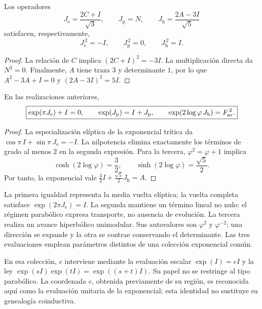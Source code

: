 \begin{proposition}
\label{euler-trit-generadores}
Los operadores
\[
 J_{\mathrm e}=\frac{2C+I}{\sqrt3},\qquad
 J_{\mathrm p}=N,\qquad
 J_{\mathrm h}=\frac{2A-3I}{\sqrt5}
\]
satisfacen, respectivamente,
\[
 J_{\mathrm e}^{\,2}=-I,\qquad
 J_{\mathrm p}^{\,2}=0,\qquad
 J_{\mathrm h}^{\,2}=I.
\]
\end{proposition}
\begin{proof}
La relación de \(C\) implica \((2C+I)^2=-3I\).
La multiplicación directa da \(N^2=0\).
Finalmente, \(A\) tiene traza \(3\) y determinante \(1\), por lo que
\(A^2-3A+I=0\) y \((2A-3I)^2=5I\).
\end{proof}

\begin{proposition}
\label{euler-trit-evaluaciones}
En las realizaciones anteriores,
\begin{equation}
 \boxed{
 \exp(\pi J_{\mathrm e})+I=0,\qquad
 \exp(J_{\mathrm p})=I+J_{\mathrm p},\qquad
 \exp(2\log\varphi\,J_{\mathrm h})=F_{\rm av}^{\,2}.}
 \label{euler-trit-tres-evaluaciones}
\end{equation}
\end{proposition}
\begin{proof}
La especialización elíptica de la exponencial trítica da
\(\cos\pi\,I+\sin\pi\,J_{\mathrm e}=-I\).
La nilpotencia elimina exactamente los términos de grado al menos \(2\)
en la segunda expresión. Para la tercera, \(\varphi^2=\varphi+1\) implica
\[
 \cosh(2\log\varphi)=\frac32,\qquad
 \sinh(2\log\varphi)=\frac{\sqrt5}{2}.
\]
Por tanto, la exponencial vale
\(\frac32I+\frac{\sqrt5}{2}J_{\mathrm h}=A\).
\end{proof}

La primera igualdad representa la media vuelta elíptica; la vuelta completa
satisface \(\exp(2\pi J_{\mathrm e})=I\). La segunda mantiene un término
lineal no nulo: el régimen parabólico expresa transporte, no ausencia de
evolución. La tercera realiza un avance hiperbólico unimodular. Sus
autovalores son \(\varphi^2\) y \(\varphi^{-2}\); una dirección se expande y
la otra se contrae conservando el determinante. Las tres evaluaciones
emplean parámetros distintos de una colección exponencial común.

En esa colección, \(e\) interviene mediante la evaluación escalar
\(\exp(I)=eI\) y la ley \(\exp(sI)\exp(tI)=\exp((s+t)I)\).
Su papel no se restringe al tipo parabólico. La coordenada \(e\), obtenida
previamente de su región, es reconocida aquí como la evaluación unitaria
de la exponencial; esta identidad no sustituye su genealogía coinductiva.

